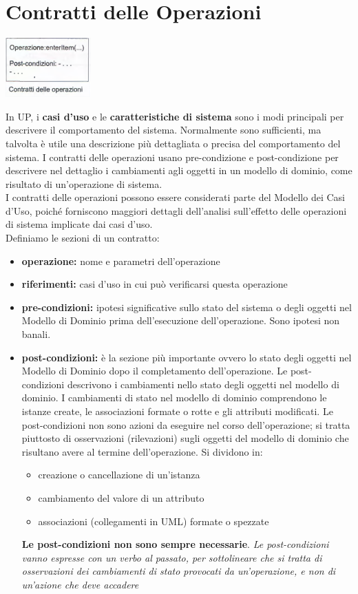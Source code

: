 \documentclass[a4paper,12pt, oneside]{book}
\begin{document}
\chapter{Contratti delle Operazioni}
\begin{center}
	\includegraphics[scale=0.7]{img/opid.png}
\end{center}
In UP, i \textbf{casi d'uso} e le \textbf{caratteristiche di sistema} sono i modi principali per descrivere il comportamento del sistema. Normalmente sono sufficienti, ma talvolta è utile una descrizione più dettagliata o precisa del comportamento del sistema. I contratti delle operazioni usano pre-condizione e post-condizione per descrivere nel dettaglio i cambiamenti agli oggetti in un modello di dominio, come risultato di un'operazione di sistema.\\
I contratti delle operazioni possono essere considerati parte del Modello dei Casi d'Uso, poiché forniscono maggiori dettagli dell'analisi sull'effetto delle operazioni di sistema implicate dai casi d'uso.\\
Definiamo le sezioni di un contratto:
\begin{itemize}
	\item \textbf{operazione:} nome e parametri dell'operazione
	\item \textbf{riferimenti:} casi d'uso in cui può verificarsi questa operazione
	\item \textbf{pre-condizioni: }ipotesi significative sullo stato del sistema o degli oggetti nel Modello di Dominio prima dell'esecuzione dell'operazione. Sono ipotesi non banali.
	\item \textbf{post-condizioni: }è la sezione più importante ovvero lo stato degli oggetti nel Modello di Dominio dopo il completamento dell'operazione. Le post-condizioni descrivono i cambiamenti nello stato degli oggetti nel modello di dominio. I cambiamenti di stato nel modello di dominio comprendono le istanze create, le associazioni formate o rotte e gli attributi modificati. Le post-condizioni non sono azioni da eseguire nel corso dell'operazione; si tratta piuttosto di osservazioni (rilevazioni) sugli oggetti del modello di dominio che risultano avere al termine dell'operazione. Si dividono in:
	\begin{itemize}
		\item creazione o cancellazione di un'istanza
		\item cambiamento del valore di un attributo
		\item associazioni (collegamenti in UML) formate o spezzate
	\end{itemize}
	\textbf{Le post-condizioni non sono sempre necessarie}. \textit{Le post-condizioni vanno espresse con un verbo al passato, per sottolineare che si tratta di osservazioni dei cambiamenti di stato provocati da un'operazione, e non di un'azione che deve accadere}
\end{itemize}
\end{document}
